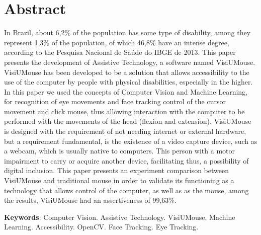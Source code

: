 \chapter*{Abstract}
\begin{singlespace}
{\fontsize{12pt}{\baselineskip} \selectfont \noindent
In Brazil, about 6,2\% of the population has some type of disability, among
they represent 1,3\% of the population, of which 46,8\% have an intense degree, according to the {Pesquisa  Nacional de Saúde do IBGE de 2013}. This paper presents the development of Assistive Technology, a software named VisiUMouse. VisiUMouse has been developed to be a solution that allows accessibility to the use of the computer by people with physical disabilities, especially in the higher. In this paper we used the concepts of Computer Vision and Machine Learning, for recognition of eye movements and face tracking control of the cursor movement and click mouse, thus allowing interaction with the computer to be performed with the movements of the head (flexion and extension). VisiUMouse is designed with the requirement of not needing internet or external hardware, but a requirement fundamental, is the existence of a video capture device, such as a webcam, which is usually native to computers. This person with a motor impairment to carry or acquire another device, facilitating thus, a possibility of digital inclusion. This paper presents an experiment comparison between VisiUMouse and traditional mouse in order to validate its functioning as a technology that allows control of the computer, as well as as the mouse, among the results, VisiUMouse had an assertiveness of 99,63\%.

}
\end{singlespace}

\begin{singlespace}
\noindent \onehalfspacing
\textbf{Keywords}: Computer Vision. Assistive Technology. VisiUMouse. Machine Learning. Accessibility. OpenCV. Face Tracking. Eye Tracking.
\end{singlespace}
